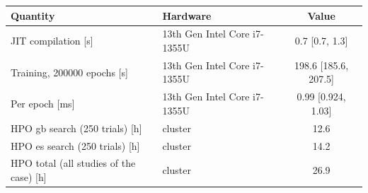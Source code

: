 \begin{tabular}{llc}
\toprule
Quantity & Hardware & Value \\
\midrule
JIT compilation [s] & 13th Gen Intel Core i7-1355U & \num{0.7} [\num{0.7}, \num{1.3}] \\
Training, \num{200000} epochs [s] & 13th Gen Intel Core i7-1355U & \num{198.6} [\num{185.6}, \num{207.5}] \\
Per epoch [ms] & 13th Gen Intel Core i7-1355U & \num{0.99} [\num{0.924}, \num{1.03}] \\
HPO gb search (250 trials) [h] & cluster & \num{12.6} \\
HPO es search (250 trials) [h] & cluster & \num{14.2} \\
HPO total (all studies of the case) [h] & cluster & \num{26.9} \\
\bottomrule
\end{tabular}
